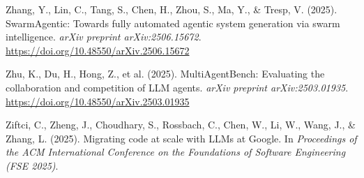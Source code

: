 \documentclass[12pt,a4paper]{article}
\begin{document}
Zhang, Y., Lin, C., Tang, S., Chen, H., Zhou, S., Ma, Y., \& Tresp, V.
(2025). SwarmAgentic: Towards fully automated agentic system generation
via swarm intelligence. \emph{arXiv preprint arXiv:2506.15672}.
\url{https://doi.org/10.48550/arXiv.2506.15672}

Zhu, K., Du, H., Hong, Z., et al. (2025). MultiAgentBench: Evaluating
the collaboration and competition of LLM agents. \emph{arXiv preprint
arXiv:2503.01935}. \url{https://doi.org/10.48550/arXiv.2503.01935}

Ziftci, C., Zheng, J., Choudhary, S., Rossbach, C., Chen, W., Li, W.,
Wang, J., \& Zhang, L. (2025). Migrating code at scale with LLMs at
Google. In \emph{Proceedings of the ACM International Conference on the
Foundations of Software Engineering (FSE 2025)}.

\newpage
\appendix

\end{document}
